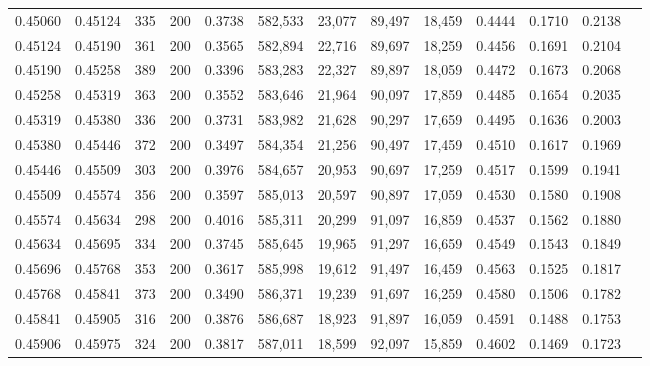 \begin{tabular}{rrrrrrrrrrrrr}
0.45060 & 0.45124 &   335 & 200 &                                     0.3738 & 582,533 &  23,077 &  89,497 &  18,459 & 0.4444 & 0.1710 & 0.2138 \\
0.45124 & 0.45190 &   361 & 200 &                                     0.3565 & 582,894 &  22,716 &  89,697 &  18,259 & 0.4456 & 0.1691 & 0.2104 \\
0.45190 & 0.45258 &   389 & 200 &                                     0.3396 & 583,283 &  22,327 &  89,897 &  18,059 & 0.4472 & 0.1673 & 0.2068 \\
0.45258 & 0.45319 &   363 & 200 &                                     0.3552 & 583,646 &  21,964 &  90,097 &  17,859 & 0.4485 & 0.1654 & 0.2035 \\
0.45319 & 0.45380 &   336 & 200 &                                     0.3731 & 583,982 &  21,628 &  90,297 &  17,659 & 0.4495 & 0.1636 & 0.2003 \\
0.45380 & 0.45446 &   372 & 200 &                                     0.3497 & 584,354 &  21,256 &  90,497 &  17,459 & 0.4510 & 0.1617 & 0.1969 \\
0.45446 & 0.45509 &   303 & 200 &                                     0.3976 & 584,657 &  20,953 &  90,697 &  17,259 & 0.4517 & 0.1599 & 0.1941 \\
0.45509 & 0.45574 &   356 & 200 &                                     0.3597 & 585,013 &  20,597 &  90,897 &  17,059 & 0.4530 & 0.1580 & 0.1908 \\
0.45574 & 0.45634 &   298 & 200 &                                     0.4016 & 585,311 &  20,299 &  91,097 &  16,859 & 0.4537 & 0.1562 & 0.1880 \\
0.45634 & 0.45695 &   334 & 200 &                                     0.3745 & 585,645 &  19,965 &  91,297 &  16,659 & 0.4549 & 0.1543 & 0.1849 \\
0.45696 & 0.45768 &   353 & 200 &                                     0.3617 & 585,998 &  19,612 &  91,497 &  16,459 & 0.4563 & 0.1525 & 0.1817 \\
0.45768 & 0.45841 &   373 & 200 &                                     0.3490 & 586,371 &  19,239 &  91,697 &  16,259 & 0.4580 & 0.1506 & 0.1782 \\
0.45841 & 0.45905 &   316 & 200 &                                     0.3876 & 586,687 &  18,923 &  91,897 &  16,059 & 0.4591 & 0.1488 & 0.1753 \\
0.45906 & 0.45975 &   324 & 200 &                                     0.3817 & 587,011 &  18,599 &  92,097 &  15,859 & 0.4602 & 0.1469 & 0.1723 \\

\end{tabular}
